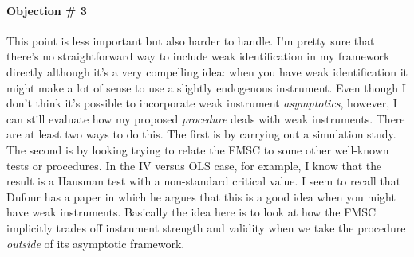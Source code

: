 \documentclass[12pt]{article}\usepackage[]{graphicx}\usepackage[]{color}
\theoremstyle{definition}
\begin{document}
\paragraph{Objection \# 3} This point is less important but also harder to handle. I'm pretty sure that there's no straightforward way to include weak identification in my framework directly although it's a very compelling idea: when you have weak identification it might make a lot of sense to use a slightly endogenous instrument. Even though I don't think it's possible to incorporate weak instrument \emph{asymptotics}, however, I can still evaluate how my proposed \emph{procedure} deals with weak instruments. There are at least two ways to do this. The first is by carrying out a simulation study. The second is by looking trying to relate the FMSC to some other well-known tests or procedures. In the IV versus OLS case, for example, I know that the result is a Hausman test with a non-standard critical value. I seem to recall that Dufour has a paper in which he argues that this is a good idea when you might have weak instruments. Basically the idea here is to look at how the FMSC implicitly trades off instrument strength and validity when we take the procedure \emph{outside} of its asymptotic framework.  
\end{document}
